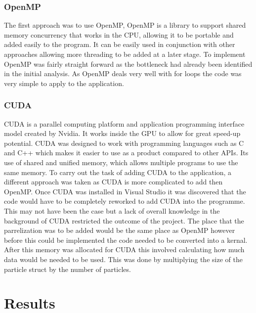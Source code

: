 \documentclass[12pt]{article}
\begin{document}
\subsubsection{OpenMP}
The first approach was to use OpenMP, OpenMP is a library to support shared memory concurrency that works in the CPU, allowing it to be portable and added easily to the program. It can  be easily used in conjunction with other approaches allowing more threading to be added at a later stage.
\newline 
To implement OpenMP was fairly straight forward as the bottleneck had already been identified in the initial analysis. As OpenMP deals very well with for loops the code was very simple to apply to the application.
\subsubsection{CUDA}
CUDA is a  parallel computing platform and application programming interface model created by Nvidia. It works inside the GPU to allow for great speed-up potential. CUDA was designed to work with programming languages such as C and C++ which makes it easier to use as a product compared to other APIs. Its use of shared and unified memory, which allows multiple programs to use the same memory.
\newline
 To carry out the task of adding CUDA to the application, a different approach was taken as CUDA is more complicated to add then OpenMP. Once CUDA was installed in Visual Studio it was discovered that the code would have to be completely reworked to add CUDA into the programme. This may not have been the case but a lack of overall knowledge in the background of CUDA restricted the outcome of the project.
 \newline 
 The place that the parrelization was to be added would be the same place as OpenMP however before this could be implemented the code needed to be converted into a kernal. After this memory was allocated for CUDA this involved calculating how much data would be needed to be used. This was done by multiplying the size of the particle struct by the number of particles.

\section{Results}
\end{document}

